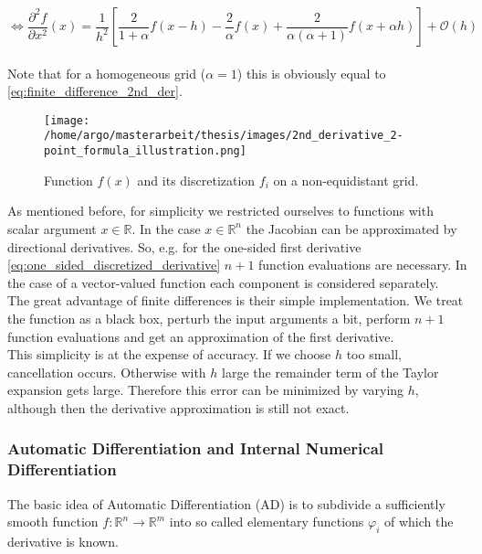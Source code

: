 \documentclass{scrartcl}[12pt, halfparskip]
\numberwithin{equation}{section}
\numberwithin{figure}{section}
\numberwithin{table}{section}
\begin{document}
\begin{equation}
\Leftrightarrow \frac{\partial^2 f}{\partial x^2}(x) = \frac{1}{h^2} \left[ \frac{2}{1+\alpha} f(x-h) - \frac{2}{\alpha} f(x) + \frac{2}{\alpha (\alpha+1)} f(x+\alpha h) \right] + \mathcal{O}(h) 
\label{eq:2_point_formula_inhomogeneous}
\end{equation} \\

Note that for a homogeneous grid ($\alpha=1$) this is obviously equal to \cref{eq:finite_difference_2nd_der}. \\

\begin{figure}[H]
	\centering
	\texttt{[image: /home/argo/masterarbeit/thesis/images/2nd\_derivative\_2-point\_formula\_illustration.png]}
	\caption{Function $f(x)$ and its discretization $f_i$ on a non-equidistant grid.}
	\label{fig:2_point_formula_illustration}
\end{figure}


As mentioned before, for simplicity we restricted ourselves to functions with scalar argument $x \in \mathbb{R}$. In the case $x \in \mathbb{R}^n$ the Jacobian can be approximated by directional derivatives. So, e.g. for the one-sided first derivative \cref{eq:one_sided_discretized_derivative} $n+1$ function evaluations are necessary. In the case of a vector-valued function each component is considered separately. \\

The great advantage of finite differences is their simple implementation. We treat the function as a black box, perturb the input arguments a bit, perform $n+1$ function evaluations and get an approximation of the first derivative. \\
This simplicity is at the expense of accuracy. If we choose $h$ too small, cancellation occurs. Otherwise with $h$ large the remainder term of the Taylor expansion gets large. Therefore this error can be minimized by varying $h$, although then the derivative approximation is still not exact.




\subsubsection{Automatic Differentiation and Internal Numerical Differentiation}
\label{sec:AD_IND}
\label{sec:Automatic_diff_IND_theory}
The basic idea of Automatic Differentiation (AD) is to subdivide a sufficiently smooth function ${f: \mathbb{R}^n \rightarrow \mathbb{R}^m}$ into so called elementary functions $\varphi_i$ of which the derivative is known. 
\end{document}
